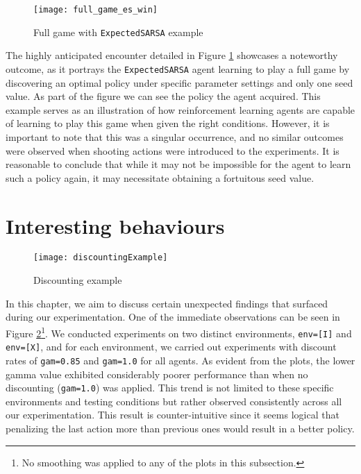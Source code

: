 \begin{figure}[h]
    \centering
    \texttt{[image: full\_game\_es\_win]}
    \caption{Full game with \texttt{ExpectedSARSA} example}
    \label{fig:full_game_es_eg}
\end{figure}

The highly anticipated encounter detailed in Figure \ref{fig:full_game_es_eg} showcases a noteworthy outcome, as it portrays the \texttt{ExpectedSARSA} agent learning to play a full game by discovering an optimal policy under specific parameter settings and only one seed value. As part of the figure we can see the policy the agent acquired. This example serves as an illustration of how reinforcement learning agents are capable of learning to play this game when given the right conditions. However, it is important to note that this was a singular occurrence, and no similar outcomes were observed when shooting actions were introduced to the experiments. It is reasonable to conclude that while it may not be impossible for the agent to learn such a policy again, it may necessitate obtaining a fortuitous seed value.

\section{Interesting behaviours}
\label{intbeh}
\begin{figure}[h]
    \centering
    \texttt{[image: discountingExample]}
    \caption{Discounting example}
    \label{fig:discounting_eg}
\end{figure}

In this chapter, we aim to discuss certain unexpected findings that surfaced during our experimentation. One of the immediate observations can be seen in Figure \ref{fig:discounting_eg}\footnote{No smoothing was applied to any of the plots in this subsection.}. We conducted experiments on two distinct environments, \texttt{env=[I]} and \texttt{env=[X]}, and for each environment, we carried out experiments with discount rates of \texttt{gam=0.85} and \texttt{gam=1.0} for all agents. As evident from the plots, the lower gamma value exhibited considerably poorer performance than when no discounting (\texttt{gam=1.0}) was applied. This trend is not limited to these specific environments and testing conditions but rather observed consistently across all our experimentation. This result is counter-intuitive since it seems logical that penalizing the last action more than previous ones would result in a better policy.

